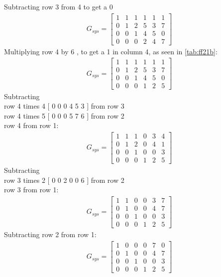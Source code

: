 Subtracting row 3 from 4 to get a 0 \\
\begin{align}
    G_{sys} = 
    \begin{bmatrix}
        1 & 1 & 1 & 1 & 1 & 1 \\
        0 & 1 & 2 & 5 & 3 & 7 \\
        0 & 0 & 1 & 4 & 5 & 0 \\
        0 & 0 & 0 & 2 & 4 & 7 
    \end{bmatrix}
\end{align}
Multiplying row 4 by 6 , to get a 1 in column 4, as seen in \ref{tab:ff21b}: \\
\begin{align}
    G_{sys} = 
    \begin{bmatrix}
        1 & 1 & 1 & 1 & 1 & 1 \\
        0 & 1 & 2 & 5 & 3 & 7 \\
        0 & 0 & 1 & 4 & 5 & 0 \\
        0 & 0 & 0 & 1 & 2 & 5 
    \end{bmatrix}
\end{align} 
Subtracting \\ row 4 times 4 $[$ 0 0 0 4 5 3 $]$ from row 3 \\row 4 times 5 $[$ 0 0 0 5 7 6 $]$ from row 2 \\ row 4 from row 1:\\
\begin{align}
    G_{sys} = 
    \begin{bmatrix}
        1 & 1 & 1 & 0 & 3 & 4 \\
        0 & 1 & 2 & 0 & 4 & 1 \\
        0 & 0 & 1 & 0 & 0 & 3 \\
        0 & 0 & 0 & 1 & 2 & 5 
    \end{bmatrix}
\end{align} 
Subtracting \\row 3 times 2 $[$ 0 0 2 0 0 6 $]$ from row 2 \\ row 3 from row 1:\\
\begin{align}
    G_{sys} = 
    \begin{bmatrix}
        1 & 1 & 0 & 0 & 3 & 7 \\
        0 & 1 & 0 & 0 & 4 & 7 \\
        0 & 0 & 1 & 0 & 0 & 3 \\
        0 & 0 & 0 & 1 & 2 & 5 
    \end{bmatrix}
\end{align} 
Subtracting row 2 from row 1:\\
\begin{align}
    G_{sys} = 
    \begin{bmatrix}
        1 & 0 & 0 & 0 & 7 & 0 \\
        0 & 1 & 0 & 0 & 4 & 7 \\
        0 & 0 & 1 & 0 & 0 & 3 \\
        0 & 0 & 0 & 1 & 2 & 5 
    \end{bmatrix}
\end{align} 

